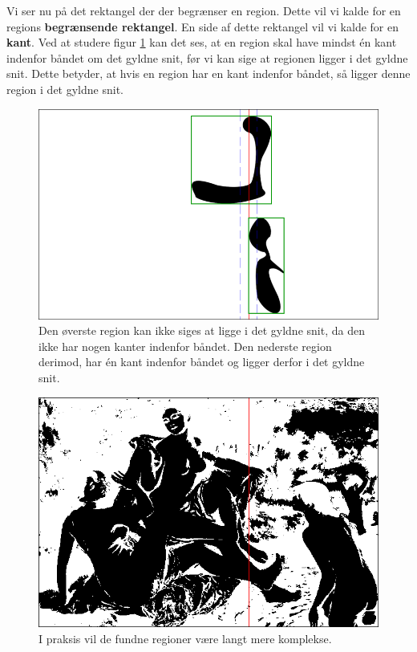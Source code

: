 {Vi ser nu på det rektangel der der begrænser en region. Dette vil vi
kalde for en regions \textbf{begrænsende rektangel}. En side af
dette rektangel vil vi kalde for en \textbf{kant}. Ved at studere figur
\ref{bbox_section} kan det ses, at en region skal have mindst én kant
indenfor båndet om det gyldne snit, før vi kan sige at regionen ligger i
det gyldne snit. Dette betyder, at hvis en region har en kant indenfor
båndet, så ligger denne region i det gyldne snit.

\begin{figure}[h]
    \begin{center}
        \includegraphics[scale=\imgscale,angle=0]{afsnit/vores_implementation/billeder/naiv_algoritme/bbox_section}
    \end{center}
    \caption[Afgrænsende rektangler]{Den øverste region kan ikke
    siges at ligge i det gyldne snit, da den ikke har nogen kanter
    indenfor båndet. Den nederste region derimod, har én kant
    indenfor båndet og ligger derfor i det gyldne snit.}
    \label{bbox_section}
\end{figure}

\begin{figure}[!h]
    \begin{center}
        \includegraphics[scale=0.42,angle=0]{afsnit/vores_implementation/billeder/naiv_algoritme/bathers_mockup_blob}
    \end{center}
    \caption[Interessante regioner i praksis]{I praksis vil de
    fundne regioner være langt mere komplekse.}
    \label{realworld_example}
\end{figure}

}
